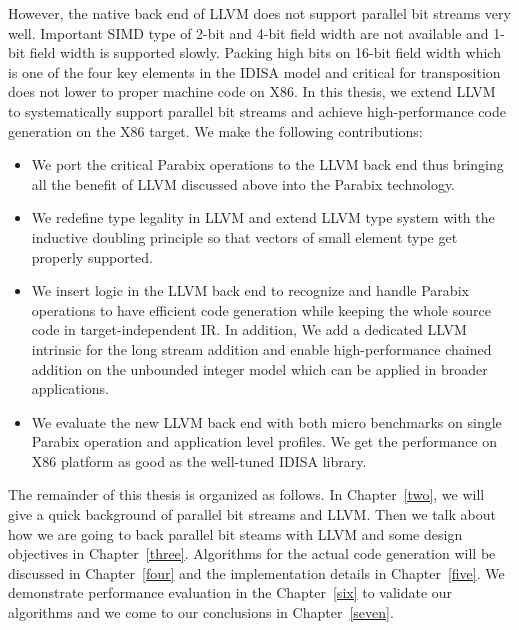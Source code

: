 However, the native back end of LLVM does not support parallel bit streams very well. Important SIMD type of 2-bit and 4-bit field width are not available and 1-bit field width is supported slowly. Packing high bits on 16-bit field width which is one of the four key elements in the IDISA model and critical for transposition does not lower to proper machine code on X86. In this thesis, we extend LLVM to systematically support parallel bit streams and achieve high-performance code generation on the X86 target. We make the following contributions:

\begin{itemize}
  \item We port the critical Parabix operations to the LLVM back end thus bringing all the benefit of LLVM discussed above into the Parabix technology.
  \item We redefine type legality in LLVM and extend LLVM type system with the inductive doubling principle so that vectors of small element type get properly supported.
  \item We insert logic in the LLVM back end to recognize and handle Parabix operations to have efficient code generation while keeping the whole source code in target-independent IR\@. In addition, We add a dedicated LLVM intrinsic for the long stream addition and enable high-performance chained addition on the unbounded integer model which can be applied in broader applications.
  \item We evaluate the new LLVM back end with both micro benchmarks on single Parabix operation and application level profiles. We get the performance on X86 platform as good as the well-tuned IDISA library.
\end{itemize}

The remainder of this thesis is organized as follows. In Chapter~\ref{two}, we will give a quick background of parallel bit streams and LLVM\@. Then we talk about how we are going to back parallel bit steams with LLVM and some design objectives in Chapter~\ref{three}. Algorithms for the actual code generation will be discussed in Chapter~\ref{four} and the implementation details in Chapter~\ref{five}. We demonstrate performance evaluation in the Chapter~\ref{six} to validate our algorithms and we come to our conclusions in Chapter~\ref{seven}.

